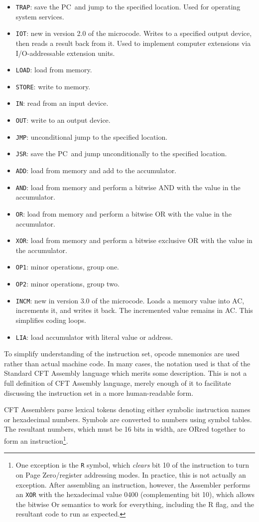 \documentclass[11pt,a4paper,twocolumns]{article}
\newcommand\hex[1]{\textsf{#1}}
\newcommand\register[1]{\textsf{#1}}
\newcommand\A{\register{AC}}
\newcommand\PC{\register{PC}}
\begin{document}
\begin{itemize}
\item {\tt TRAP}: save the \PC\ and jump to the specified location. Used for operating system services.
\item {\tt IOT}: new in version 2.0 of the microcode. Writes to a specified output device, then reads a result back from it. Used to implement computer extensions via I/O-addressable extension units.
\item {\tt LOAD}: load from memory.
\item {\tt STORE}: write to memory.
\item {\tt IN}: read from an input device.
\item {\tt OUT}: write to an output device.
\item {\tt JMP}: unconditional jump to the specified location.
\item {\tt JSR}: save the \PC\ and jump unconditionally to the specified location.
\item {\tt ADD}: load from memory and add to the accumulator.
\item {\tt AND}: load from memory and perform a bitwise AND with the value in the accumulator.
\item {\tt OR}: load from memory and perform a bitwise OR with the value in the accumulator.
\item {\tt XOR}: load from memory and perform a bitwise exclusive OR with the value in the accumulator.
\item {\tt OP1}: minor operations, group one.
\item {\tt OP2}: minor operations, group two.
\item {\tt INCM}: new in version 3.0 of the microcode. Loads a memory
  value into \A, increments it, and writes it back. The incremented
  value remains in \A{}. This simplifies coding loops.
\item {\tt LIA}: load accumulator with literal value or address.
\end{itemize}

To simplify understanding of the instruction set, opcode mnemonics are
used rather than actual machine code. In many cases, the notation used
is that of the Standard CFT Assembly language which merits some
description. This is not a full definition of CFT Assembly language,
merely enough of it to facilitate discussing the instruction set in
a more human-readable form.

CFT Assemblers parse lexical tokens denoting either symbolic
instruction names or hexadecimal numbers. Symbols are converted to
numbers using symbol tables. The resultant numbers, which must be 16
bits in width, are ORred together to form an instruction\footnote{One
  exception is the {\tt R} symbol, which {\em clears\/} bit 10 of the
  instruction to turn on Page Zero/register addressing modes. In
  practice, this is not actually an exception. After assembling an
  instruction, however, the Assembler performs an {\tt XOR} with the
  hexadecimal value \hex{0400} (complementing bit 10), which allows
  the bitwise Or semantics to work for everything, including the R
  flag, and the resultant code to run as expected.}.
\end{document}
